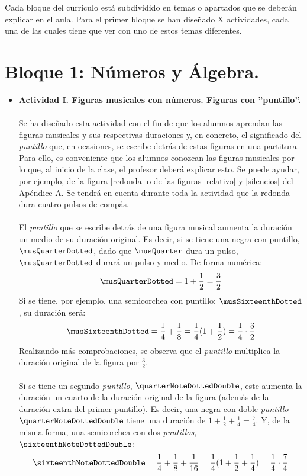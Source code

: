 \documentclass[a4paper, openright, 11pt, titlepage]{report}
\theoremstyle{definition}\newtheorem{defin}[propo]{Definition}
\theoremstyle{definition}\newtheorem{obser}[propo]{Remark}
\theoremstyle{definition}\newtheorem{ejem}[propo]{Ejemplo}
\theoremstyle{definition}\newtheorem{algoritmo}[propo]{Algoritmo}
\begin{document}
Cada bloque del currículo está subdividido en temas o apartados que se deberán explicar en el aula. Para el primer bloque se han diseñado X actividades, cada una de las cuales tiene que ver con uno de estos temas diferentes.
\section{Bloque 1: Números y Álgebra.}
\begin{itemize}
    \item \textbf{Actividad I. Figuras musicales con números. Figuras con ''puntillo''.}\\\\
    Se ha diseñado esta actividad con el fin de que los alumnos aprendan las figuras musicales y sus respectivas duraciones y, en concreto, el significado del \textit{puntillo} que, en ocasiones, se escribe detrás de estas figuras en una partitura.\\
    Para ello, es conveniente que los alumnos conozcan las figuras musicales por lo que, al inicio de la clase, el profesor deberá explicar esto. Se puede ayudar, por ejemplo, de la figura \ref{redonda} o de las figuras \ref{relativo} y \ref{silencios} del Apéndice A. Se tendrá en cuenta durante toda la actividad que la redonda dura cuatro pulsos de compás.\\\\
    El \textit{puntillo} que se escribe detrás de una figura musical aumenta la duración un medio de su duración original. Es decir, si se tiene una negra con puntillo, $\musQuarterDotted$, dado que $\musQuarter$ dura un pulso, $\musQuarterDotted$ durará un pulso y medio. De forma numérica: $$\musQuarterDotted = 1 + \frac{1}{2} = \frac{3}{2}$$
    Si se tiene, por ejemplo, una semicorchea con puntillo: $\musSixteenthDotted$, su duración será: $$\musSixteenthDotted = \frac{1}{4} + \frac{1}{8} = \frac{1}{4}(1 + \frac{1}{2}) = \frac{1}{4}\cdot\frac{3}{2}$$
    Realizando más comprobaciones, se observa que el \textit{puntillo} multiplica la duración original de la figura por $\frac{3}{2}$.\\\\
    Si se tiene un segundo \textit{puntillo}, $\quarterNoteDottedDouble$, este aumenta la duración un cuarto de la duración original de la figura (además de la duración extra del primer puntillo). Es decir, una negra con doble \textit{puntillo} $\quarterNoteDottedDouble$ tiene una duración de $1 + \frac{1}{2} + \frac{1}{4} = \boxed{\frac{7}{4}}$. Y, de la misma forma, una semicorchea con dos \textit{puntillos}, $\sixteenthNoteDottedDouble$: $$\sixteenthNoteDottedDouble = \frac{1}{4} + \frac{1}{8} + \frac{1}{16} = \frac{1}{4}(1+\frac{1}{2} + \frac{1}{4}) = \frac{1}{4}\cdot\frac{7}{4}$$

\end{itemize}
\end{document}
